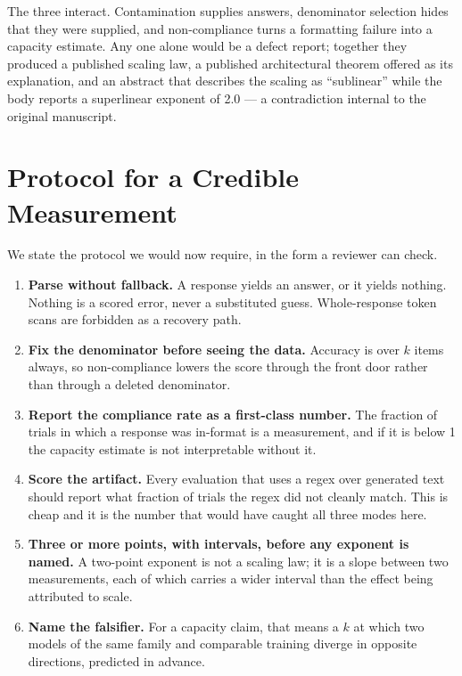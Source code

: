 \documentclass[preprint,12pt]{elsarticle}
\theoremstyle{plain}
\begin{document}
The three interact. Contamination supplies answers, denominator selection hides that they were supplied, and non-compliance turns a formatting failure into a capacity estimate. Any one alone would be a defect report; together they produced a published scaling law, a published architectural theorem offered as its explanation, and an abstract that describes the scaling as ``sublinear'' while the body reports a superlinear exponent of 2.0 --- a contradiction internal to the original manuscript.

\section{Protocol for a Credible Measurement}
\label{sec:protocol}

We state the protocol we would now require, in the form a reviewer can check.

\begin{enumerate}
\item \textbf{Parse without fallback.} A response yields an answer, or it yields nothing. Nothing is a scored error, never a substituted guess. Whole-response token scans are forbidden as a recovery path.
\item \textbf{Fix the denominator before seeing the data.} Accuracy is over $k$ items always, so non-compliance lowers the score through the front door rather than through a deleted denominator.
\item \textbf{Report the compliance rate as a first-class number.} The fraction of trials in which a response was in-format is a measurement, and if it is below 1 the capacity estimate is not interpretable without it.
\item \textbf{Score the artifact.} Every evaluation that uses a regex over generated text should report what fraction of trials the regex did not cleanly match. This is cheap and it is the number that would have caught all three modes here.
\item \textbf{Three or more points, with intervals, before any exponent is named.} A two-point exponent is not a scaling law; it is a slope between two measurements, each of which carries a wider interval than the effect being attributed to scale.
\item \textbf{Name the falsifier.} For a capacity claim, that means a $k$ at which two models of the same family and comparable training diverge in opposite directions, predicted in advance.
\end{enumerate}
\end{document}
